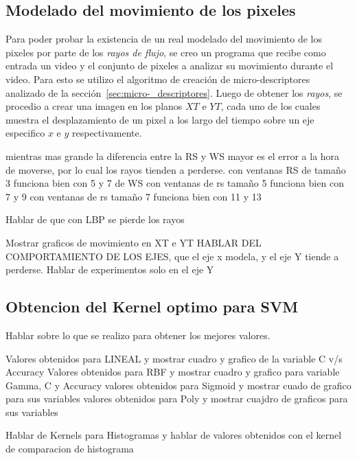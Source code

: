 \subsection{Modelado del movimiento de los pixeles}
\label{exp:rayos}
Para poder probar la existencia de un real modelado del movimiento de los pixeles por parte de los \textit{rayos de flujo}, se creo un programa que recibe como entrada un video y el conjunto de pixeles a analizar su movimiento durante el video. Para esto se utilizo el algoritmo de creación de micro-descriptores analizado de la sección~\ref{sec:micro-_descriptores}. Luego de obtener los \textit{rayos}, se procedio a crear una imagen en los planos $XT$ e $YT$, cada uno de los cuales muestra el desplazamiento de un pixel a los largo del tiempo sobre un eje especifico $x$ e $y$ respectivamente.  

mientras mas grande la diferencia entre la RS y WS mayor es el error a la hora de moverse, por lo cual los rayos tienden a perderse.
con ventanas RS de tamaño 3 funciona bien con 5 y 7 de WS
con ventanas de rs tamaño 5 funciona bien con 7 y 9
con ventanas de rs tamaño 7 funciona bien con 11 y 13

Hablar de que con LBP se pierde los rayos

Mostrar graficos de movimiento en XT e YT
HABLAR DEL COMPORTAMIENTO DE LOS EJES, que el eje x modela, y el eje Y tiende a perderse.
Hablar de experimentos solo en el eje Y


\subsection{Obtencion del Kernel optimo para SVM}

Hablar sobre lo que se realizo para obtener los mejores valores.

Valores obtenidos para LINEAL y mostrar cuadro y grafico de la variable C v/s Accuracy
Valores obtenidos para RBF y mostrar cuadro y grafico para variable Gamma, C y Accuracy
valores obtenidos para Sigmoid y mostrar cuado de grafico para sus variables
valores obtenidos para Poly y mostrar cuajdro de graficos para sus variables

Hablar de Kernels para Histogramas y hablar de valores obtenidos con el kernel de comparacion de histograma


